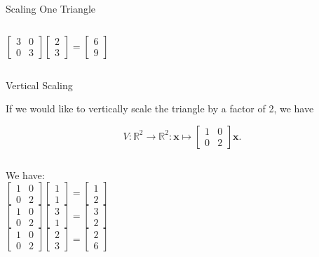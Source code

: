 \documentclass[xcolor=dvipsnames,aspectratio=169,t]{beamer}
\begin{document}
\begin{frame}{Scaling One Triangle}
\begin{columns}[T]
\[ \begin{bmatrix} 3 & 0 \\ 0 & 3 \end{bmatrix} \begin{bmatrix} 2 \\ 3 \end{bmatrix} =  \begin{bmatrix} 6 \\ 9 \end{bmatrix}\]

\end{columns}

\end{frame}

\begin{frame}{Vertical Scaling}  %

If we would like to vertically scale the triangle by a factor of 2, we have

\[ V: \mathbb{R}^2 \to \mathbb{R}^2: \mathbf{x} \mapsto \begin{bmatrix} 1 & 0 \\ 0 & 2 \end{bmatrix} \mathbf{x} .\]

\begin{columns}[T]

\column{0.5\tw}

We have:
\[ \begin{bmatrix} 1 & 0 \\ 0 & 2 \end{bmatrix} \begin{bmatrix} 1 \\ 1 \end{bmatrix} = \begin{bmatrix} 1 \\ 2 \end{bmatrix} \]
\[ \begin{bmatrix} 1 & 0 \\ 0 & 2 \end{bmatrix} \begin{bmatrix} 3 \\ 1 \end{bmatrix} =  \begin{bmatrix} 3 \\ 2 \end{bmatrix} \]
 \[ \begin{bmatrix} 1 & 0 \\ 0 & 2 \end{bmatrix} \begin{bmatrix} 2 \\ 3 \end{bmatrix} =  \begin{bmatrix} 2 \\ 6 \end{bmatrix} \]


\end{columns}
\end{frame}
\end{document}
